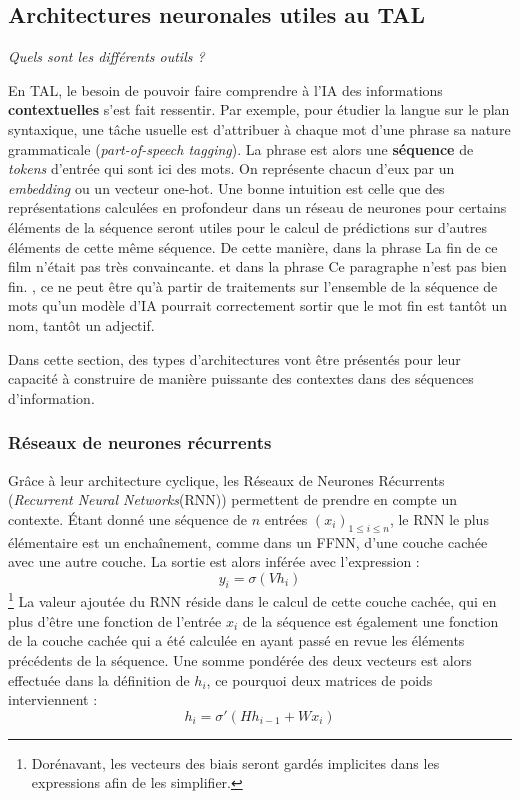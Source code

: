 \documentclass[12pt, french, twoside]{report}
\begin{document}

\subsection{Architectures neuronales utiles au TAL}
\textit{Quels sont les différents outils ?}

En TAL, le besoin de pouvoir faire comprendre à l'IA des informations \textbf{contextuelles} s'est fait ressentir. Par exemple, pour étudier la langue sur le plan syntaxique, une tâche usuelle est d'attribuer à chaque mot d'une phrase sa nature grammaticale (\textit{part-of-speech tagging}). La phrase est alors une \textbf{séquence} de \textit{tokens} d'entrée qui sont ici des mots. On représente chacun d'eux par un \textit{embedding} ou un vecteur one-hot. Une bonne intuition est celle que des représentations calculées en profondeur dans un réseau de neurones pour certains éléments de la séquence seront utiles pour le calcul de prédictions sur d'autres éléments de cette même séquence. De cette manière, dans la phrase \og La fin de ce film n'était pas très convaincante. \fg{} et dans la phrase \og Ce paragraphe n'est pas bien fin. \fg, ce ne peut être qu'à partir de traitements sur l'ensemble de la séquence de mots qu'un modèle d'IA pourrait correctement sortir que le mot \og fin \fg{}  est tantôt un nom, tantôt un adjectif.

Dans cette section, des types d'architectures vont être présentés pour leur capacité à construire de manière puissante des contextes dans des séquences d'information.
\subsubsection{Réseaux de neurones récurrents}

Grâce à leur architecture cyclique, les Réseaux de Neurones Récurrents (\textit{Recurrent Neural Networks}(RNN)) permettent de prendre en compte un contexte. Étant donné une séquence de $n$ entrées $(x_i)_{1\leq i \leq n}$, le RNN le plus élémentaire est un enchaînement, comme dans un FFNN, d'une couche cachée avec une autre couche. La sortie est alors inférée avec l'expression :
\begin{equation}
    y_i = \sigma(Vh_i)
\end{equation}\footnote{Dorénavant, les vecteurs des biais seront gardés implicites dans les expressions afin de les simplifier.}
La valeur ajoutée du RNN réside dans le calcul de cette couche cachée, qui en plus d'être une fonction de l'entrée $x_i$ de la séquence est également une fonction de la couche cachée qui a été calculée en ayant passé en revue les éléments précédents de la séquence. Une somme pondérée des deux vecteurs est alors effectuée dans la définition de $h_i$, ce pourquoi deux matrices de poids interviennent :
\begin{equation}
    h_i = \sigma'(Hh_{i-1} + Wx_i)
\end{equation}
\end{document}
